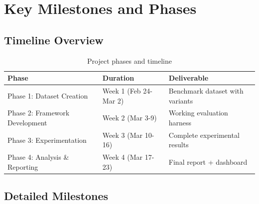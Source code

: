 \documentclass[11pt,a4paper]{article}
\begin{document}
\section{Key Milestones and Phases}

\subsection{Timeline Overview}

\begin{table}[h]
\centering
\begin{tabular}{@{}lll@{}}
\toprule
\textbf{Phase} & \textbf{Duration} & \textbf{Deliverable} \\ \midrule
Phase 1: Dataset Creation & Week 1 (Feb 24-Mar 2) & Benchmark dataset with variants \\
Phase 2: Framework Development & Week 2 (Mar 3-9) & Working evaluation harness \\
Phase 3: Experimentation & Week 3 (Mar 10-16) & Complete experimental results \\
Phase 4: Analysis \& Reporting & Week 4 (Mar 17-23) & Final report + dashboard \\ \bottomrule
\end{tabular}
\caption{Project phases and timeline}
\end{table}

\subsection{Detailed Milestones}
\end{document}
